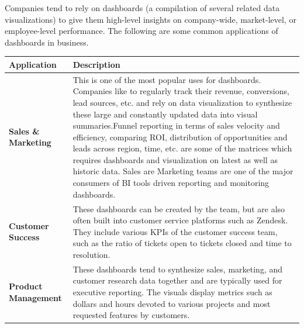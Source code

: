 \documentclass[]{book}
\begin{document}
Companies tend to rely on dashboards (a compilation of several related data visualizations) to give them high-level insights on company-wide, market-level, or employee-level performance. The following are some common applications of dashboards in business.

\begin{longtable}[]{@{}ll@{}}
\toprule
\begin{minipage}[b]{0.15\columnwidth}\raggedright
\textbf{Application}\strut
\end{minipage} & \begin{minipage}[b]{0.79\columnwidth}\raggedright
\textbf{Description}\strut
\end{minipage}\tabularnewline
\midrule
\endhead
\begin{minipage}[t]{0.15\columnwidth}\raggedright
\textbf{Sales \& Marketing}\strut
\end{minipage} & \begin{minipage}[t]{0.79\columnwidth}\raggedright
This is one of the most popular uses for dashboards. Companies like to regularly track their revenue, conversions, lead sources, etc. and rely on data visualization to synthesize these large and constantly updated data into visual summaries.Funnel reporting in terms of sales velocity and efficiency, comparing ROI, distribution of opportunities and leads across region, time, etc. are some of the matrices which requires dashboards and visualization on latest as well as historic data. Sales are Marketing teams are one of the major consumers of BI tools driven reporting and monitoring dashboards.\strut
\end{minipage}\tabularnewline
\begin{minipage}[t]{0.15\columnwidth}\raggedright
\textbf{Customer Success}\strut
\end{minipage} & \begin{minipage}[t]{0.79\columnwidth}\raggedright
These dashboards can be created by the team, but are also often built into customer service platforms such as Zendesk. They include various KPIs of the customer success team, such as the ratio of tickets open to tickets closed and time to resolution.\strut
\end{minipage}\tabularnewline
\begin{minipage}[t]{0.15\columnwidth}\raggedright
\textbf{Product Management}\strut
\end{minipage} & \begin{minipage}[t]{0.79\columnwidth}\raggedright
These dashboards tend to synthesize sales, marketing, and customer research data together and are typically used for executive reporting. The visuals display metrics such as dollars and hours devoted to various projects and most requested features by customers.\strut

\end{minipage}
\end{longtable}
\end{document}

